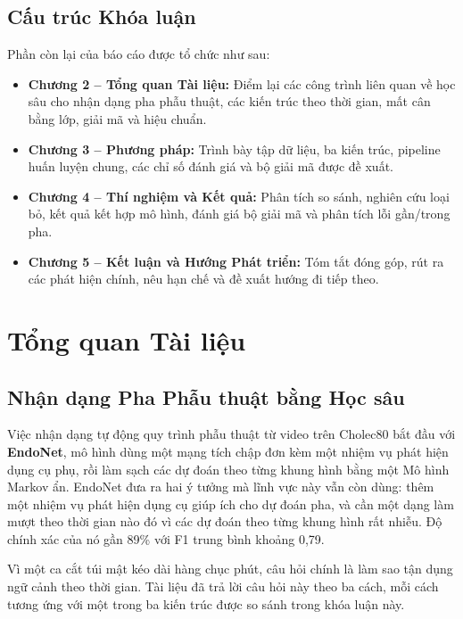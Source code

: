 \documentclass[11pt,a4paper]{report}
\begin{document}
\section{Cấu trúc Khóa luận}

Phần còn lại của báo cáo được tổ chức như sau:
\begin{itemize}
    \item \textbf{Chương 2 -- Tổng quan Tài liệu:} Điểm lại các công trình liên quan về học sâu cho nhận dạng pha phẫu thuật, các kiến trúc theo thời gian, mất cân bằng lớp, giải mã và hiệu chuẩn.
    \item \textbf{Chương 3 -- Phương pháp:} Trình bày tập dữ liệu, ba kiến trúc, pipeline huấn luyện chung, các chỉ số đánh giá và bộ giải mã được đề xuất.
    \item \textbf{Chương 4 -- Thí nghiệm và Kết quả:} Phân tích so sánh, nghiên cứu loại bỏ, kết quả kết hợp mô hình, đánh giá bộ giải mã và phân tích lỗi gần/trong pha.
    \item \textbf{Chương 5 -- Kết luận và Hướng Phát triển:} Tóm tắt đóng góp, rút ra các phát hiện chính, nêu hạn chế và đề xuất hướng đi tiếp theo.
\end{itemize}


\chapter{Tổng quan Tài liệu}

\section{Nhận dạng Pha Phẫu thuật bằng Học sâu}

Việc nhận dạng tự động quy trình phẫu thuật từ video trên Cholec80 bắt đầu với \textbf{EndoNet}, mô hình dùng một mạng tích chập đơn kèm một nhiệm vụ phát hiện dụng cụ phụ, rồi làm sạch các dự đoán theo từng khung hình bằng một Mô hình Markov ẩn. EndoNet đưa ra hai ý tưởng mà lĩnh vực này vẫn còn dùng: thêm một nhiệm vụ phát hiện dụng cụ giúp ích cho dự đoán pha, và cần một dạng làm mượt theo thời gian nào đó vì các dự đoán theo từng khung hình rất nhiễu. Độ chính xác của nó gần 89\% với F1 trung bình khoảng 0,79.

Vì một ca cắt túi mật kéo dài hàng chục phút, câu hỏi chính là làm sao tận dụng ngữ cảnh theo thời gian. Tài liệu đã trả lời câu hỏi này theo ba cách, mỗi cách tương ứng với một trong ba kiến trúc được so sánh trong khóa luận này.
\end{document}
